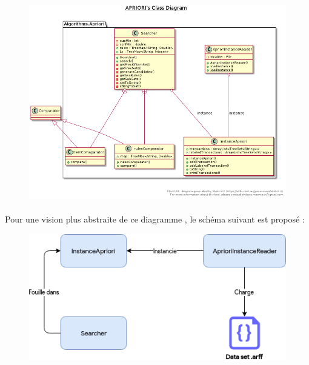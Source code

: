 			
			\begin{figure}[H]
				\centering
				\includegraphics[width=0.75\linewidth]{apriori/images/uml.png}
			\end{figure}
			\paragraph{}
			Pour une vision plus abstraite de ce diagramme , le schéma suivant est proposé : 
			\begin{figure}[H]
				\centering
				\includegraphics[width=0.75\linewidth]{apriori/images/apriori_schema.png}
			\end{figure}
		
